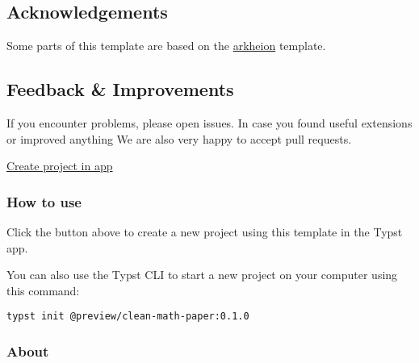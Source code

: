 \subsection{Acknowledgements}\label{acknowledgements}

Some parts of this template are based on the
\href{https://github.com/mgoulao/arkheion}{arkheion} template.

\subsection{Feedback \& Improvements}\label{feedback-improvements}

If you encounter problems, please open issues. In case you found useful
extensions or improved anything We are also very happy to accept pull
requests.

\href{/app?template=clean-math-paper&version=0.1.0}{Create project in
app}

\subsubsection{How to use}\label{how-to-use}

Click the button above to create a new project using this template in
the Typst app.

You can also use the Typst CLI to start a new project on your computer
using this command:

\begin{verbatim}
typst init @preview/clean-math-paper:0.1.0
\end{verbatim}



\subsubsection{About}\label{about}

